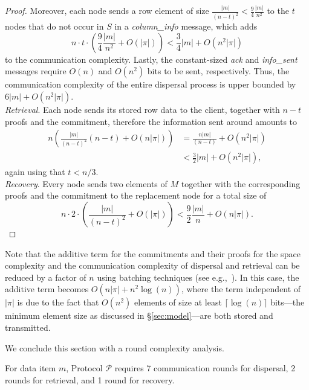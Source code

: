 \documentclass[sigconf,screen]{acmart}
\begin{document}
\begin{proof}
Moreover, each node sends a row element of size $\frac{|m|}{(n-t)^2} < \frac{9}{4}\frac{|m|}{n^2}$ to the $t$ nodes that do not occur in $S$ in a \emph{column\_info} message, which adds
$$n \cdot t \cdot \left(\frac{9}{4}\frac{|m|}{n^2} + O(|\pi|)\right) < \frac{3}{4} |m| + O(n^2|\pi|)$$
to the communication complexity.
Lastly, the constant-sized \emph{ack} and \emph{info\_sent} messages require $O(n)$ and $O(n^2)$ bits to be sent, respectively. Thus, the communication complexity of the entire dispersal process is upper bounded by $6|m| + O(n^2|\pi|)$.
\\
\emph{Retrieval}. Each node sends its stored row data to the client, together with $n-t$ proofs and the commitment, therefore the information sent around amounts to 
\begin{align*}
n\left(\frac{|m|}{(n-t)^2}(n-t) + O(n|\pi|)\right) &= \frac{n|m|}{(n-t)} + O(n^2|\pi|) \\
&< \frac{3}{2}|m| + O(n^2|\pi|),
\end{align*}
again using that $t < n/3$.
\\
\emph{Recovery}. Every node sends two elements of $M$ together with the corresponding proofs and the commitment to the replacement node for a total size of
$$n \cdot 2 \cdot \left(\frac{|m|}{(n-t)^2} + O(|\pi|)\right) < \frac{9}{2}\frac{|m|}{n} + O(n|\pi|).$$
\end{proof}

Note that the additive term for the commitments and their proofs for the space complexity and the communication complexity of dispersal and retrieval can be reduced by a factor of $n$ using batching techniques (see e.g.,~\cite{alhaddad2024}).
In this case, the additive term becomes $O(n|\pi| + n^2\log(n))$, where the term independent of $|\pi|$ is due to the fact that $O(n^2)$ elements of size at least $\lceil\log(n)\rceil$ bits---the minimum element size as discussed in \S\ref{sec:model}---are both stored and transmitted.

We conclude this section with a round complexity analysis.

\begin{theorem}
 For data item $m$, Protocol $\mathcal{P}$ requires 7 communication rounds for dispersal, 2 rounds for retrieval, and 1 round for recovery.
\end{theorem}
\end{document}

